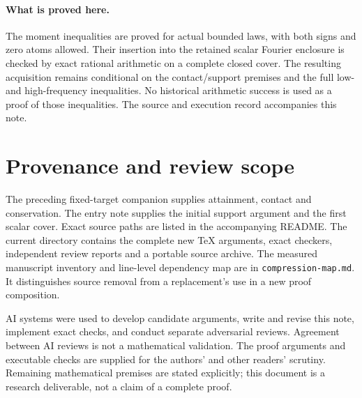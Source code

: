 \documentclass[11pt,a4paper]{article}
\begin{document}
\paragraph{What is proved here.}
The moment inequalities are proved for actual bounded laws, with both
signs and zero atoms allowed. Their insertion into the retained scalar
Fourier enclosure is checked by exact rational arithmetic on a complete
closed cover. The resulting acquisition remains conditional on the
contact/support premises and the full low- and high-frequency inequalities.
No historical arithmetic success is used as a proof of those inequalities.
The source and execution record accompanies this note.







\appendix


\section{Provenance and review scope}
The preceding fixed-target companion supplies attainment, contact and
conservation. The entry note supplies the initial support argument and
the first scalar cover. Exact source paths are listed in the accompanying
README.
The current directory contains the complete new TeX arguments, exact
checkers, independent review reports and a portable source archive.
The measured manuscript inventory and line-level dependency map are in
\texttt{compression-map.md}. It distinguishes source removal from a
replacement's use in a new proof composition.

AI systems were used to develop candidate arguments, write and revise this
note, implement exact checks, and conduct separate adversarial reviews.
Agreement between AI reviews is not a mathematical validation. The proof
arguments and executable checks are supplied for the authors' and other
readers' scrutiny. Remaining mathematical premises are stated explicitly;
this document is a research deliverable, not a claim of a complete proof.
\end{document}
